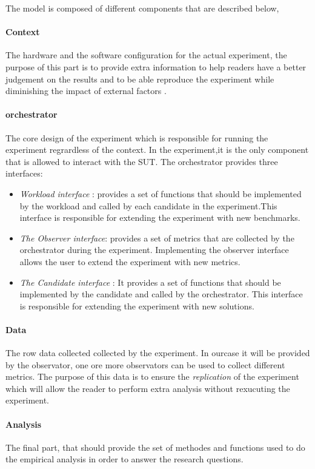 The model is composed of different components that are described below,
\paragraph{Context}
The hardware and the software configuration for the actual experiment, the purpose of this part is to provide extra information to help readers have a better judgement on the results and to be able reproduce the experiment while diminishing the impact of  external factors .

\paragraph{orchestrator}

The core design of the experiment which is responsible for running the experiment regrardless of the context.
In the experiment,it is  the only component that is allowed to interact with the SUT.
The orchestrator provides three interfaces:
\begin{itemize}
    \item \emph{Workload interface} : provides a set of functions that should be implemented by the workload and called by each candidate in the experiment.This interface is responsible for extending the experiment with new benchmarks.
    \item \emph{The Observer interface}: provides a set of metrics that are collected by the orchestrator during the experiment. Implementing the observer interface allows the user to extend the experiment with new metrics.
    \item \emph{The Candidate interface} : It provides a set of functions that should be implemented by the candidate and called by the orchestrator. This interface is responsible for extending the experiment with new solutions.
\end{itemize}

\paragraph{Data}
The row data collected collected by the experiment. In ourcase it will be provided by the observator, one ore more observators can be used to collect different metrics. The purpose of this data is to ensure the \emph{replication} of the experiment which will allow the reader to perform extra analysis without rexucuting the experiment.


\paragraph{Analysis}
The final part, that should provide the set of methodes and functions used to do the empirical analysis in order to answer the research questions.



